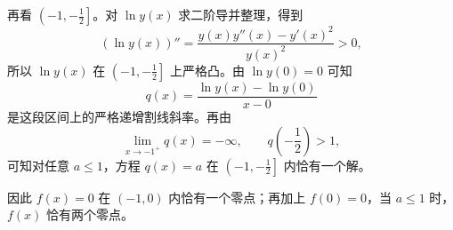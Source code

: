 \begin{solution}
再看 $\left(-1,-\frac12\right]$。对 \(\ln y(x)\) 求二阶导并整理，得到
\[
(\ln y(x))''=\frac{y(x)y''(x)-y'(x)^2}{y(x)^2}>0,
\]
所以 $\ln y(x)$ 在 $\left(-1,-\frac12\right]$ 上严格凸。由 $\ln y(0)=0$ 可知
\[
q(x)=\frac{\ln y(x)-\ln y(0)}{x-0}
\]
是这段区间上的严格递增割线斜率。再由
\[
\lim_{x\to-1^+}q(x)=-\infty,\qquad
q\!\left(-\frac12\right)>1,
\]
可知对任意 $a\le1$，方程 $q(x)=a$ 在 $\left(-1,-\frac12\right]$ 内恰有一个解。

因此 $f(x)=0$ 在 $(-1,0)$ 内恰有一个零点；再加上 $f(0)=0$，当 $a\le1$ 时，$f(x)$ 恰有两个零点。
\end{solution}
